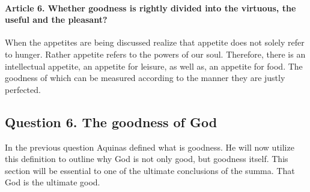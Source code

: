 \documentclass{ucetd}
\begin{document}
\paragraph{Article 6. Whether goodness is rightly divided into the virtuous, the useful and the pleasant?}
When the appetites are being discussed realize that appetite does not solely refer to hunger. Rather appetite refers to the powers of our soul. Therefore, there is an intellectual appetite, an appetite for leisure, as well as, an appetite for food. The goodness of which can be measured according to the manner they are justly perfected.


\subsection{Question 6. The goodness of God}
In the previous question Aquinas defined what is goodness. He will now utilize this definition to outline why God is not only good, but goodness itself. This section will be essential to one of the ultimate conclusions of the summa. That God is the ultimate good.
\end{document}
